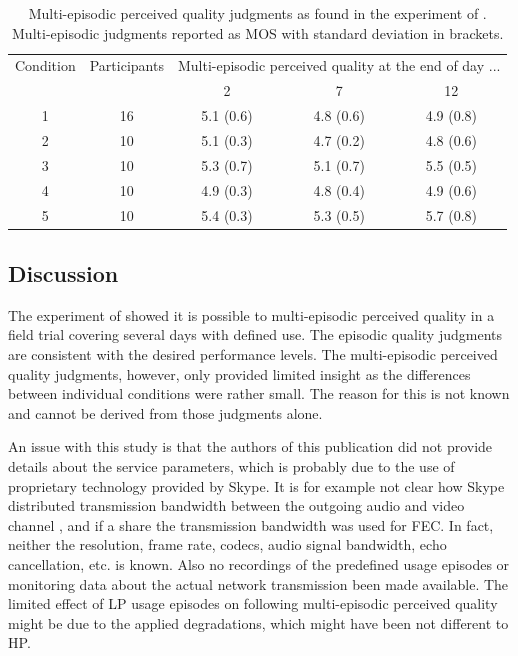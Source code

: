 
\begin{table}[h]
	\centering
	\begin{tabular}{|c|c||c|c|c|}
	Condition 	& Participants 	& \multicolumn{3}{|c|}{Multi-episodic perceived quality at the end of day ...} \\
				&				& 2	& 7 & 12 \\
	\hline
	1 			& 16 			& 5.1 (0.6) & 4.8 (0.6) & 4.9 (0.8) \\
	2 			& 10 			& 5.1 (0.3) & 4.7 (0.2) & 4.8 (0.6) \\
	3 			& 10 			& 5.3 (0.7) & 5.1 (0.7) & 5.5 (0.5) \\
	4 			& 10 			& 4.9 (0.3) & 4.8 (0.4) & 4.9 (0.6) \\
	5 			& 10 			& 5.4 (0.3) & 5.3 (0.5) & 5.7 (0.8) \\
	\hline
	\end{tabular}
	\caption{Multi-episodic perceived quality judgments as found in the experiment of \cite{moller_single-call_2011}. Multi-episodic judgments reported as \ac{MOS} with standard deviation in brackets.}
	\label{tab:chap05:results}
\end{table}

\subsection{Discussion}
The experiment of \cite{moller_single-call_2011} showed it is possible to multi-episodic perceived quality in a field trial covering several days with defined use.
The episodic quality judgments are consistent with the desired performance levels.
The multi-episodic perceived quality judgments, however, only provided limited insight as the differences between individual conditions were rather small.
The reason for this is not known and cannot be derived from those judgments alone.

An issue with this study is that the authors of this publication did not provide details about the service parameters, which is probably due to the use of proprietary technology provided by Skype.
It is for example not clear how Skype distributed transmission bandwidth between the outgoing audio and video channel \citep[cf.][]{moller_single-call_2011}, and if a share the transmission bandwidth was used for \ac{FEC}.
In fact, neither the resolution, frame rate, codecs, audio signal bandwidth, echo cancellation, etc. is known.
Also no recordings of the predefined usage episodes or monitoring data about the actual network transmission been made available.
The limited effect of \ac{LP} usage episodes on following multi-episodic perceived quality might be due to the applied degradations, which might have been not different to \ac{HP}.


